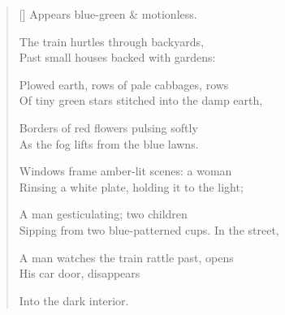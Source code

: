 \label{ch:england}
\settowidth{\versewidth}{Sipping from two blue-patterned cups.     In the street,}
\begin{verse}[\versewidth]
                    Appears blue-green \& motionless.

The train hurtles through backyards,\\
Past small houses backed with gardens:

Plowed earth, rows of pale cabbages, rows\\
Of tiny green stars stitched into the damp earth,

Borders of red flowers pulsing softly\\
As the fog lifts from the blue lawns.

Windows frame amber-lit scenes: a woman\\
Rinsing a white plate, holding it to the light;

A man gesticulating; two children\\
Sipping from two blue-patterned cups.     In the street,

A man watches the train rattle past, opens\\
His car door, disappears

Into the dark interior.
\end{verse}
